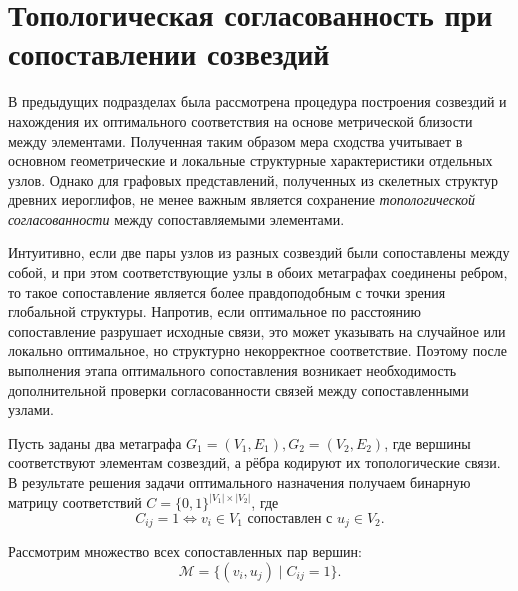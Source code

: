 
\section{Топологическая согласованность при сопоставлении созвездий}\label{subsec:ch4/sec5}
В предыдущих подразделах была рассмотрена процедура построения созвездий и нахождения их оптимального соответствия на основе метрической близости между элементами. Полученная таким образом мера сходства учитывает в основном геометрические и локальные структурные характеристики отдельных узлов. Однако для графовых представлений, полученных из скелетных структур древних иероглифов, не менее важным является сохранение \emph{топологической согласованности} между сопоставляемыми элементами.

Интуитивно, если две пары узлов из разных созвездий были сопоставлены между собой, и при этом соответствующие узлы в обоих метаграфах соединены ребром, то такое сопоставление является более правдоподобным с точки зрения глобальной структуры. Напротив, если оптимальное по расстоянию сопоставление разрушает исходные связи, это может указывать на случайное или локально оптимальное, но структурно некорректное соответствие. Поэтому после выполнения этапа оптимального сопоставления возникает необходимость дополнительной проверки согласованности связей между сопоставленными узлами.

Пусть заданы два метаграфа $G_1 = (V_1, E_1), G_2 = (V_2, E_2)$, где вершины соответствуют элементам созвездий, а рёбра кодируют их топологические связи. В результате решения задачи оптимального назначения получаем бинарную матрицу соответствий $C=\{0,1\}^{|V_1|\times|V_2|}$, где
\[
    C_{ij} = 1 \iff v_i \in V_1 \text{ сопоставлен с } u_j \in V_2.
\]

Рассмотрим множество всех сопоставленных пар вершин:
\[
    \mathcal{M} = \{(v_i, u_j) \mid C_{ij} = 1\}.
\]

